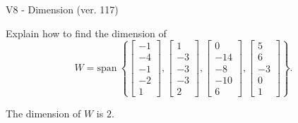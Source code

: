 \begin{exercise}
  \begin{exerciseTitle}V8 - Dimension (ver. 117)\end{exerciseTitle}
  \begin{exerciseStatement}
    Explain how to find the dimension of 
\[W=\mathrm{span}\ \left\{\left[\begin{array}{r}
-1 \\
-4 \\
-1 \\
-2 \\
1
\end{array}\right] , \left[\begin{array}{r}
1 \\
-3 \\
-3 \\
-3 \\
2
\end{array}\right] , \left[\begin{array}{r}
0 \\
-14 \\
-8 \\
-10 \\
6
\end{array}\right] , \left[\begin{array}{r}
5 \\
6 \\
-3 \\
0 \\
1
\end{array}\right]\right\}.\]



  \end{exerciseStatement}
  \begin{exerciseAnswer}
   The dimension of \(W\) is  \(2\).
  


  \end{exerciseAnswer}
\end{exercise}